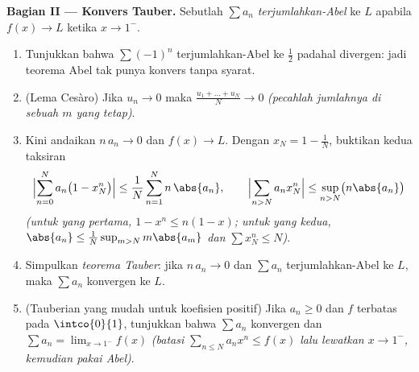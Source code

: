 \begin{problem}
\medskip
\noindent\textbf{Bagian II --- Konvers Tauber.} Sebutlah $\sum
a_n$ \emph{terjumlahkan-Abel} ke $L$ apabila $f(x) \to L$ ketika $x \to
1^-$.
\begin{enumerate}[resume]
  \item Tunjukkan bahwa $\sum (-1)^n$ terjumlahkan-Abel ke $\frac12$
        padahal divergen: jadi teorema Abel tak punya
        konvers tanpa syarat.
  \item (Lema Cesàro) Jika $u_n \to 0$ maka $\frac{u_1 + \dots
        + u_N}{N} \to 0$ \emph{(pecahlah jumlahnya di sebuah $m$ yang
        tetap)}.
  \item Kini andaikan $n\,a_n \to 0$ dan $f(x) \to L$. Dengan $x_N =
        1 - \frac1N$, buktikan kedua taksiran
        \[
        \Bigl|\sum_{n=0}^{N} a_n\bigl(1 - x_N^n\bigr)\Bigr|
        \leq \frac{1}{N}\sum_{n=1}^{N} n\,\abs{a_n},
        \qquad
        \Bigl|\sum_{n>N} a_n x_N^n\Bigr|
        \leq \sup_{n>N}\bigl(n\abs{a_n}\bigr)
        \]
        \emph{(untuk yang pertama, $1 - x^n \leq n(1-x)$; untuk yang
        kedua, $\abs{a_n} \leq \frac{1}{N}\sup_{m>N} m\abs{a_m}$ dan
        $\sum x_N^n \leq N$)}.
  \item Simpulkan \emph{teorema Tauber}: jika $n\,a_n \to 0$ dan
        $\sum a_n$ terjumlahkan-Abel ke $L$, maka $\sum a_n$
        konvergen ke $L$.
  \item (Tauberian yang mudah untuk koefisien positif) Jika $a_n
        \geq 0$ dan $f$ terbatas pada $\intco{0}{1}$, tunjukkan bahwa
        $\sum a_n$ konvergen dan $\sum a_n = \lim_{x\to1^-}
        f(x)$ \emph{(batasi $\sum_{n\leq N}a_nx^n \leq f(x)$ lalu
        lewatkan $x \to 1^-$, kemudian pakai Abel)}.
\end{enumerate}


\end{problem}
